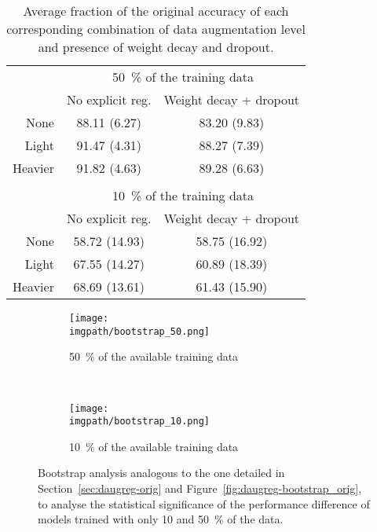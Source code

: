 {\begin{table}[htb]
  \begin{center}
    \begin{tabular}{rcc}
      & \multicolumn{2}{c}{50~\% of the training data}    \\
      \cline{2-3} 
              & No explicit reg. & Weight decay + dropout \\
      None    & 88.11 (6.27)     & 83.20 (9.83)           \\
      Light   & 91.47 (4.31)     & 88.27 (7.39)           \\
      Heavier & 91.82 (4.63)     & 89.28 (6.63)           \\
      \vspace{-7pt}\\
      & \multicolumn{2}{c}{10~\% of the training data}    \\
      \cline{2-3} 
              & No explicit reg. & Weight decay + dropout \\
      None    & 58.72 (14.93)    & 58.75 (16.92)          \\
      Light   & 67.55 (14.27)    & 60.89 (18.39)          \\
      Heavier & 68.69 (13.61)    & 61.43 (15.90) 
    \end{tabular}
  \end{center}
  \caption{Average fraction of the original accuracy of each corresponding combination of data augmentation level and presence of weight decay and dropout.}
  \label{tab:daugreg-less_data}
\end{table}

\begin{figure}[ht]
  \centering
  \begin{subfigure}{\linewidth}
      \texttt{[image: \\imgpath/bootstrap\_50.png]}
      \caption{50~\% of the available training data}
      \label{fig:daugreg-bootstrap_means_50}
  \end{subfigure}
  \\
  \begin{subfigure}{\linewidth}
      \texttt{[image: \\imgpath/bootstrap\_10.png]}
      \caption{10~\% of the available training data}
      \label{fig:daugreg-bootstrap_means_10}
  \end{subfigure}
  \caption{Bootstrap analysis analogous to the one detailed in Section~\ref{sec:daugreg-orig} and Figure~\ref{fig:daugreg-bootstrap_orig}, to analyse the statistical significance of the performance difference of models trained with only 10 and 50~\% of the data.}
  \label{fig:daugreg-bootstrap_less_data}
\end{figure}

}
